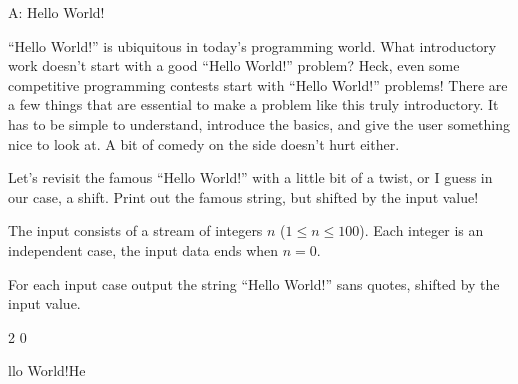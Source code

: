 \begin{problem}{A: Hello World!}

``Hello World!'' is ubiquitous in today's programming world.
What introductory work doesn't start with a good ``Hello World!'' problem?
Heck, even some competitive programming contests start with ``Hello World!'' problems!
There are a few things that are essential to make a problem like this truly introductory.
It has to be simple to understand, introduce the basics, and give the user something nice to look at.
A bit of comedy on the side doesn't hurt either.

Let's revisit the famous ``Hello World!'' with a little bit of a twist, or I guess in our case, a shift.
Print out the famous string, but shifted by the input value!

\end{problem}

\begin{formalin}
The input consists of a stream of integers $n$ ($1 \leq n \leq 100$).
Each integer is an independent case, the input data ends when $n = 0$.
\end{formalin}

\begin{formalout}
For each input case output the string ``Hello World!'' sans quotes, shifted by the input value.
\end{formalout}

\begin{datain}
2
0
\end{datain}

\begin{dataout}
llo World!He
\end{dataout}

